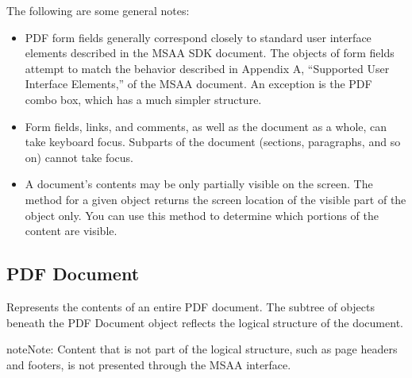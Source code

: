 \documentclass[letterpaper,12pt,english,openany,oneside]{sphinxmanual}
\begin{document}
The following are some general notes:
\begin{itemize}
\item {} 
PDF form fields generally correspond closely to standard user interface elements described in the MSAA SDK document. The  objects of form fields attempt to match the behavior described in Appendix A, “Supported User Interface Elements,” of the MSAA document. An exception is the PDF combo box, which has a much simpler structure.

\item {} 
Form fields, links, and comments, as well as the document as a whole, can take keyboard focus. Subparts of the document (sections, paragraphs, and so on) cannot take focus.

\item {} 
A document’s contents may be only partially visible on the screen. The  method for a given object returns the screen location of the visible part of the object only. You can use this method to determine which portions of the content are visible.

\end{itemize}




\subsection{PDF Document}
\label{\detokenize{MSAA_PDF:pdf-document}}
Represents the contents of an entire PDF document. The subtree of  objects beneath the PDF Document object reflects the logical structure of the document.

\begin{sphinxadmonition}{note}{Note:}
Content that is not part of the logical structure, such as page headers and footers, is not presented through the MSAA interface.
\end{sphinxadmonition}
\end{document}
